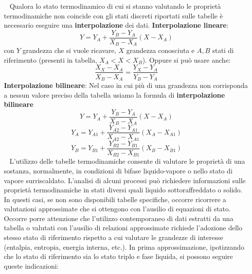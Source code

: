 \ \newline
Qualora lo stato termodinamico di cui si stanno valutando le proprietà termodinamiche non
coincide con gli stati discreti riportati sulle tabelle è necessario eseguire una \textbf{interpolazione}
dei dati.\newline
\newline
\textbf{Interpolazione lineare}:
\[
    Y = Y_A + \frac{Y_B - Y_A}{X_B - X_A} (X - X_A)
\]
con $Y$ grandezza che si vuole ricavare, $X$ grandezza conosciuta e $A,B$ stati di riferimento (presenti in tabella, $X_A<X<X_B$).\newline
Oppure si può usare anche:
\[
    \frac{X_X - X_A}{X_B - X_A} = \frac{Y_X - Y_A}{Y_B - Y_A}
\]
\textbf{Interpolazione bilineare}:
Nel caso in cui più di una grandezza non corrisponda a nessun valore preciso della tabella usiamo la formula di \textbf{interpolazione bilineare}
\[
    Y = Y_A + \frac{Y_B - Y_A}{X_B - X_A}(X - X_A)
\]
\[
    Y_A = Y_{A1} + \frac{Y_{A2}- Y_{A1}}{X_{A2}- X_{A1}} (X_A - X_{A1})
\]
\[
    Y_B = Y_{B1} + \frac{Y_{B2}- Y_{B1}}{X_{B2}- X_{B1}} (X_B - X_{B1})
\]
\ \newline
L’utilizzo delle tabelle termodinamiche consente di valutare le proprietà di una sostanza,
normalmente, in condizioni di bifase liquido-vapore o nello stato di vapore surriscaldato.
L’analisi di alcuni processi può richiedere informazioni sulle proprietà termodinamiche in
stati diversi quali liquido sottoraffreddato o solido. \newline
In questi casi, se non sono disponibili tabelle specifiche, occorre ricorrere a valutazioni
approssimate che si ottengono con l’ausilio di equazioni di stato. \newline
Occorre porre attenzione che l’utilizzo contemporaneo di dati estratti da una tabella o valutati
con l’ausilio di relazioni approssimate richiede l’adozione dello stesso stato di riferimento
rispetto a cui valutare le grandezze di interesse (entalpia, entropia, energia interna, etc.). \newline
In prima approssimazione, ipotizzando che lo stato di riferimento sia lo stato triplo e fase
liquida, si possono seguire queste indicazioni: 

